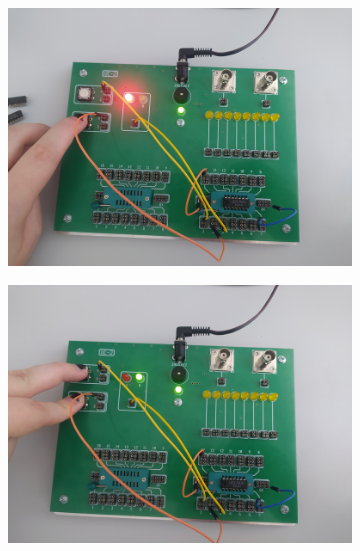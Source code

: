 \begin{itemize}
\begin{figure}[H]
\begin{subfigure}[h]{0.4\textwidth}
                    \includegraphics[width=\textwidth]{img/NAND/test/1652306732872_scaled.png}
                \end{subfigure}
                \begin{subfigure}[h]{0.4\textwidth}
                    \includegraphics[width=\textwidth]{img/NAND/test/1652306732862_scaled.png}
                \end{subfigure}
        \end{figure}

\pagebreak


\end{itemize}

